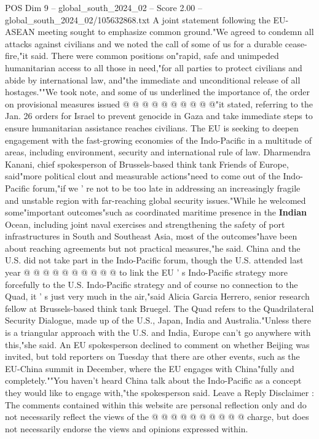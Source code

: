 \begin{textsample}{POS Dim 9 – global\_south\_2024\_02 – Score 2.00 – global\_south\_2024\_02/105632868.txt}
A joint statement following the EU-ASEAN meeting sought to emphasize common ground."We agreed to condemn all attacks against civilians and we noted the call of some of us for a durable cease-fire,"it said.
There were common positions on"rapid, safe and unimpeded humanitarian access to all those in need,"for all parties to protect civilians and abide by international law, and"the immediate and unconditional release of all hostages.""We took note, and some of us underlined the importance of, the order on provisional measures issued @ @ @ @ @ @ @ @ @ @"it stated, referring to the Jan. 26 orders for Israel to prevent genocide in Gaza and take immediate steps to ensure humanitarian assistance reaches civilians.
The EU is seeking to deepen engagement with the fast-growing economies of the Indo-Pacific in a multitude of areas, including environment, security and international rule of law.
Dharmendra Kanani, chief spokesperson of Brussels-based think tank Friends of Europe, said"more political clout and measurable actions"need to come out of the Indo-Pacific forum,"if we ' re not to be too late in addressing an increasingly fragile and unstable region with far-reaching global security issues."While he welcomed some"important outcomes"such as coordinated maritime presence in the \textbf{Indian} Ocean, including joint naval exercises and strengthening the safety of port infrastructures in South and Southeast Asia, most of the outcomes"have been about reaching agreements but not practical measures,"he said.
China and the U.S. did not take part in the Indo-Pacific forum, though the U.S. attended last year @ @ @ @ @ @ @ @ @ @ to link the EU ' s Indo-Pacific strategy more forcefully to the U.S.
Indo-Pacific strategy and of course no connection to the Quad, it ' s just very much in the air,"said Alicia Garcia Herrero, senior research fellow at Brussels-based think tank Bruegel.
The Quad refers to the Quadrilateral Security Dialogue, made up of the U.S., Japan, India and Australia."Unless there is a triangular approach with the U.S. and India, Europe can't go anywhere with this,"she said.
An EU spokesperson declined to comment on whether Beijing was invited, but told reporters on Tuesday that there are other events, such as the EU-China summit in December, where the EU engages with China"fully and completely.""You haven't heard China talk about the Indo-Pacific as a concept they would like to engage with,"the spokesperson said.
Leave a Reply Disclaimer : The comments contained within this website are personal reflection only and do not necessarily reflect the views of the @ @ @ @ @ @ @ @ @ @ charge, but does not necessarily endorse the views and opinions expressed within.

\end{textsample}

